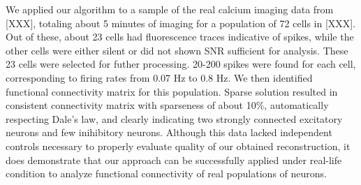 

We applied our algorithm to a sample of the real calcium imaging data from [XXX], totaling about 5 minutes of imaging for a population of 72 cells in [XXX]. Out of these, about 23 cells had fluorescence traces indicative of spikes, while the other cells were either silent or did not shown SNR sufficient for analysis. These 23 cells were selected for futher processing. 20-200 spikes were found for each cell, corresponding to firing rates from 0.07 Hz to 0.8 Hz.
We then identified functional connectivity matrix for this population. Sparse solution resulted in consistent connectivity matrix with sparseness of about 10\%, automatically respecting Dale's law, and clearly indicating two strongly connected excitatory neurons and few inihibitory neurons. Although this data lacked independent controls necessary to properly evaluate quality of our obtained reconstruction, it does demonstrate that our approach can be successfully applied under real-life condition to analyze functional connectivity of real populations of neurons.
